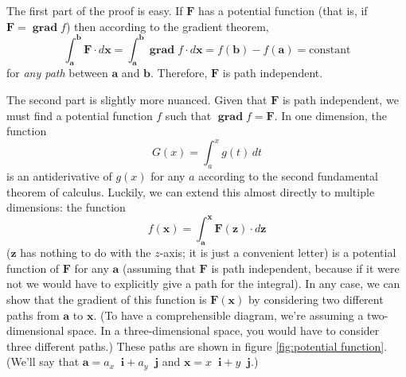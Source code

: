 \documentclass{myarticle}
\DeclareMathOperator{\grad}{\mathbf{grad}}
\renewcommand{\vec}[1]{\mathbf{#1}}
\newcommand{\unitvector}[1]{
  \mathop{}\!\vec{#1}
}
\newcommand{\ih}{\unitvector{i}}
\newcommand{\jh}{\unitvector{j}}
\theoremstyle{nospace}
\newtheorem{old series theorem}{Theorem}
\newenvironment{series theorem}
{\begin{mdframed}\begin{old series theorem}}
    {\end{old series theorem}\end{mdframed}}
\begin{document}
The first part of the proof is easy. If $\vec{F}$ has a potential
function (that is, if $\vec{F} = \grad f$) then according to the
gradient theorem,
\[
  \int_\vec{a}^\vec{b} \vec{F} \cdot d\vec{x}
  = \int_\vec{a}^\vec{b} \grad f \cdot d\vec{x}
  = f(\vec{b}) - f(\vec{a})
  = \text{constant}
\]
for \textit{any path} between $\vec{a}$ and $\vec{b}$. Therefore,
$\vec{F}$ is path independent.

The second part is slightly more nuanced. Given that $\vec{F}$ is path
independent, we must find a potential function $f$ such that
$\grad f = \vec{F}$. In one dimension, the function
\[
  G(x) = \int_a^x g(t) \,dt
\]
is an antiderivative of $g(x)$ for any $a$ according to the second
fundamental theorem of calculus. Luckily, we can extend this almost
directly to multiple dimensions: the function
\[
  f(\vec{x}) = \int_\vec{a}^\vec{x} \vec{F}(\vec{z}) \cdot d\vec{z}
\]
($\vec{z}$ has nothing to do with the $z$-axis; it is just a
convenient letter) is a potential function of $\vec{F}$ for any
$\vec{a}$ (assuming that $\vec{F}$ is path independent, because if it
were not we would have to explicitly give a path for the integral). In
any case, we can show that the gradient of this function is
$\vec{F}(\vec{x})$ by considering two different paths from $\vec{a}$
to $\vec{x}$. (To have a comprehensible diagram, we're assuming a
two-dimensional space. In a three-dimensional space, you would have to
consider three different paths.) These paths are shown in figure
\ref{fig:potential function}. (We'll say that
$\vec{a} = a_x \ih + a_y \jh$ and $\vec{x} = x \ih + y \jh$.)
\end{document}
